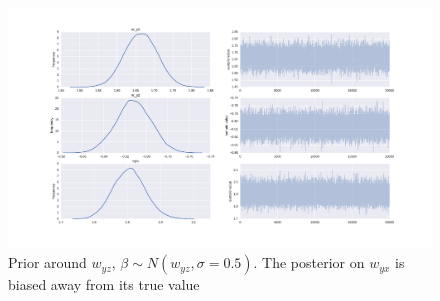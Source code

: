 \documentclass[11pt,a4paper,oneside]{book}
\theoremstyle{plain}
\theoremstyle{definition}
\begin{document}
\begin{figure}[h]
\includegraphics[scale=.3]{prior_bad_prior}
\caption{Prior around $w_{yz}$, $\beta \sim N(w_{yz},\sigma = 0.5)$. The posterior on $w_{yx}$ is biased away from its true value}
\end{figure}






\end{document}
